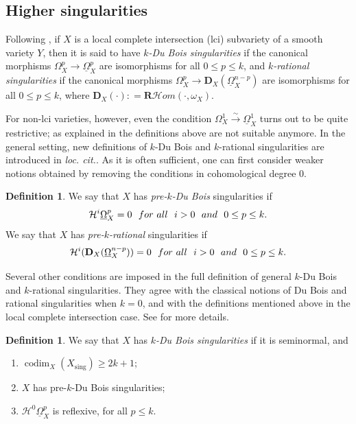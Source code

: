 \documentclass[11pt]{amsart}
\theoremstyle{definition}
\newtheorem{definition}[equation]{Definition}
\theoremstyle{plain}
\renewcommand{\H}{\mathcal H}
\newcommand{\DD}{\mathbf D}
\newcommand{\derR}{\mathbf R}
\newcommand{\xto}{\xrightarrow} %
\newcommand{\DB}{\underline{\Omega}} %
\DeclareMathOperator{\sing}{sing}
\DeclareMathOperator{\codim}{codim}
\newcounter{intro}
\begin{document}
\subsection{Higher singularities}\label{sec:higher-singularities}
Following \cite{MOPW,JKSY,FL}, if $X$ is a local complete intersection (lci) subvariety of a smooth variety $Y$, then it is said to have \textit{$k$-Du Bois singularities} if the canonical morphisms $\Omega^p_X \to \DB^p_X$ are isomorphisms for all $0\le p\le k$, and 
 \textit{$k$-rational singularities} if the canonical morphisms $\Omega^p_X \to \DD_X(\DB^{n-p}_X)$  are isomorphisms for all $0\le p\le k$, where 
 $\DD_X (\cdot) : = \derR\H om (\cdot, \omega_X)$.
 
For non-lci varieties, however, even the condition $\Omega_X^1\xto{\sim}\DB_X^1$ turns out to be quite restrictive; as explained in \cite{SVV} the definitions above are not suitable anymore. 
In the general setting, new definitions of $k$-Du Bois and $k$-rational singularities are introduced in \textit{loc. cit.}.
As it is often sufficient, one can first consider weaker notions obtained by removing the conditions in cohomological degree 0.

\begin{definition}\label{definition:pre-k-DB-rational}
	We say that $X$ has \textit{pre-$k$-Du Bois} singularities if 
		\[ \H^i\DB_X^p=0 \,\,\,\,{\rm for~ all } \,\,\,\,i>0 \,\,\,\, {\rm and} \,\,\,\, 0\le p\le k.\]
We say that $X$ has \textit{pre-$k$-rational} singularities if
		\[ \H^i (\DD_X(\DB^{n-p}_X))=0 \,\,\,\,{\rm for~ all } \,\,\,\,i>0 \,\,\,\, {\rm and} \,\,\,\, 0\le p\le k.\]
\end{definition} 

Several other conditions are imposed in the full definition of general $k$-Du Bois and $k$-rational singularities. They agree with the classical notions of Du Bois and rational singularities when $k=0$, and  with the definitions mentioned above in the local complete intersection case. See \cite[Proposition 5.5, 5.6]{SVV} for more details.

\begin{definition} 
	We say that $X$ has \textit{$k$-Du Bois singularities} if it is seminormal, and 
	\begin{enumerate}
		\item $\codim_X (X_{\sing}) \ge 2k+1$;
		\item $X$ has pre-$k$-Du Bois singularities;
		\item $\H^0\DB_X^p$ is reflexive, for all $p \le k$.
	\end{enumerate}
\end{definition}
\end{document}
